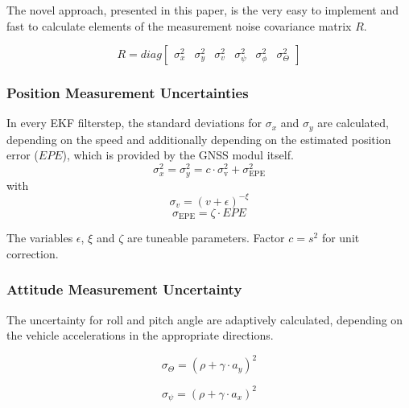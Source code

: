 \documentclass[conference]{IEEEtran}
\begin{document}
The novel approach, presented in this paper, is the very easy to implement and fast to calculate elements of the measurement noise covariance matrix $R$.

\begin{equation}\label{R}R=diag\left[\begin{matrix}\sigma_{x}^2 & \sigma_{y}^2 & \sigma_{v}^2 & \sigma_{\psi}^2 & \sigma_{\phi}^2 & \sigma_{\Theta}^2 \end{matrix}\right]\end{equation}

\subsubsection{Position Measurement Uncertainties}

In every EKF filterstep, the standard deviations for $\sigma_x$ and $\sigma_y$ are calculated, depending on the speed and additionally depending on the estimated position error ($EPE$), which is provided by the GNSS modul itself.
\begin{equation}\sigma_x^2 = \sigma_y^2 = c \cdot \sigma_\text{v}^2 + \sigma_\text{EPE}^2\end{equation}
with
\begin{equation}\label{sigmav}\sigma_v = (v+\epsilon)^{-\xi}\end{equation}
\begin{equation}\label{sigmaepe}\sigma_\text{EPE} = \zeta \cdot EPE\end{equation}

The variables $\epsilon$, $\xi$ and $\zeta$ are tuneable parameters. Factor $c=s^2$ for unit correction.

\subsubsection{Attitude Measurement Uncertainty}

The uncertainty for roll and pitch angle are adaptively calculated, depending on the vehicle accelerations in the appropriate directions.

\begin{equation}\label{sigmaroll}\sigma_\Theta=\left(\rho+\gamma\cdot a_y\right)^2\end{equation}

\begin{equation}\label{sigmapitch}\sigma_\psi=\left(\rho+\gamma\cdot a_x\right)^2\end{equation}
\end{document}
